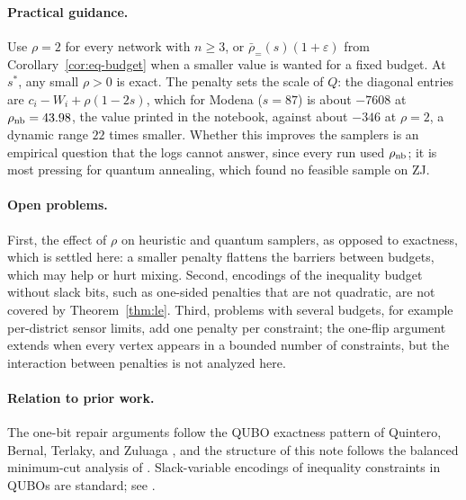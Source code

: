 \documentclass[11pt]{article}
\newcommand{\rbeq}{\bar\rho_{=}}
\begin{document}
\paragraph{Practical guidance.} Use $\rho=2$ for every network with $n\ge3$, or
$\rbeq(s)(1+\varepsilon)$ from Corollary~\ref{cor:eq-budget} when a smaller value is
wanted for a fixed budget. At $s^\ast$, any small $\rho>0$ is exact. The penalty
sets the scale of $Q$: the diagonal entries are
$c_i-W_i+\rho(1-2s)$, which for Modena ($s=87$) is about $-7608$ at
$\rho_{\rm nb}=43.98$, the value printed in the notebook, against about $-346$ at
$\rho=2$, a dynamic range $22$ times smaller. Whether this improves the samplers is
an empirical question that the logs cannot answer, since every run used
$\rho_{\rm nb}$; it is most pressing for quantum annealing, which found no feasible
sample on ZJ.

\paragraph{Open problems.} First, the effect of $\rho$ on heuristic and quantum
samplers, as opposed to exactness, which is settled here: a smaller penalty
flattens the barriers between budgets, which may help or hurt mixing. Second,
encodings of the inequality budget without slack bits, such as one-sided penalties
that are not quadratic, are not covered by Theorem~\ref{thm:le}. Third, problems
with several budgets, for example per-district sensor limits, add one penalty per
constraint; the one-flip argument extends when every vertex appears in a bounded
number of constraints, but the interaction between penalties is not analyzed here.

\paragraph{Relation to prior work.}
The one-bit repair arguments follow the QUBO exactness pattern of Quintero, Bernal,
Terlaky, and Zuluaga \cite{QBTZ2021}, and the structure of this note follows the
balanced minimum-cut analysis of \cite{RSDB2026}. Slack-variable encodings of
inequality constraints in QUBOs are standard; see \cite{Lucas2014}.
\end{document}
